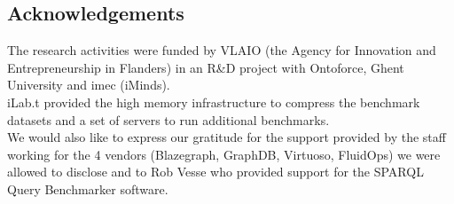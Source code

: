 \documentclass[twocolumn]{bmcart}%
\begin{document}
\begin{backmatter}
\section*{Acknowledgements}
The research activities were funded by VLAIO (the Agency for Innovation and
Entrepreneurship in Flanders) in an R\&D project with Ontoforce, Ghent University and imec (iMinds). \\
iLab.t provided the high memory infrastructure to compress the benchmark datasets and a set of servers to run additional benchmarks.\\
We would also like to express our gratitude for the support provided by the staff working for the 4 vendors (Blazegraph, GraphDB, Virtuoso, FluidOps) we were allowed to disclose and to Rob Vesse who provided support for the SPARQL Query Benchmarker software.







\end{backmatter}
\end{document}
